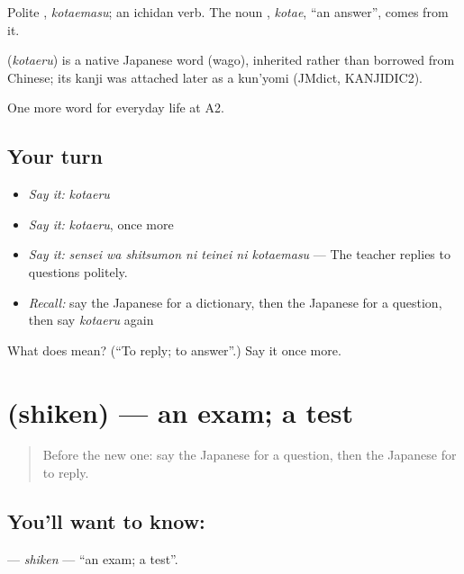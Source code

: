 Polite \textbf{}, \emph{kotaemasu}; an ichidan verb. The noun \textbf{}, \emph{kotae}, \textquotedblleft{}an answer\textquotedblright{}, comes from it.

\begin{cousinweb}
\textbf{} (\emph{kotaeru}) is a native Japanese word (wago), inherited rather than borrowed from Chinese; its kanji was attached later as a kun'yomi (JMdict, KANJIDIC2).
\end{cousinweb}

\begin{grammarlens}[title={What you've built}]
One more word for everyday life at A2.
\end{grammarlens}

\subsection*{Your turn}
\begin{itemize}
\raggedright
  \item \emph{Say it:} \emph{kotaeru}
  \item \emph{Say it:} \emph{kotaeru}, once more
  \item \emph{Say it:} \emph{sensei wa shitsumon ni teinei ni kotaemasu} — The teacher replies to questions politely.
  \item \emph{Recall:} say the Japanese for a dictionary, then the Japanese for a question, then say \emph{kotaeru} again
\end{itemize}

\begin{tcolorbox}[breakable,colback=teal!4,colframe=teal!35!black,title={Before you move on}]
What does  mean? (\textquotedblleft{}To reply; to answer\textquotedblright{}.) Say it once more.
\end{tcolorbox}
\section[\texorpdfstring{\ja{しけん} (shiken)}{しけん (shiken)}]{ (shiken) — an exam; a test}

\label{lesson:JA-C226-shiken}



\begin{quote}
Before the new one: say the Japanese for a question, then the Japanese for to reply.
\end{quote}

\subsection*{You'll want to know: }
\textbf{} — \emph{shiken} — \textquotedblleft{}an exam; a test\textquotedblright{}.

